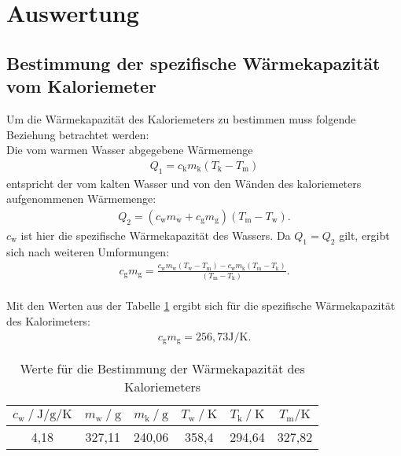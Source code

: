 \section{Auswertung}
\label{sec:Auswertung}
\subsection{Bestimmung der spezifische Wärmekapazität vom Kaloriemeter}
Um die Wärmekapazität des Kaloriemeters zu bestimmen muss folgende Beziehung betrachtet werden:\\
Die vom warmen Wasser abgegebene Wärmemenge
\begin{align}
Q_\mathrm{1}=c_\mathrm{k} m_\mathrm{k}(T_\mathrm{k}-T_\mathrm{m})
\end{align}
entspricht der vom kalten Wasser und von den Wänden des kaloriemeters aufgenommenen Wärmemenge:
\begin{align}
Q_\mathrm{2}=(c_\mathrm{w} m_\mathrm{w} + c_\mathrm{g} m_\mathrm{g}) (T_\mathrm{m}-T_\mathrm{w}).
\end{align}
$c_\mathrm{w}$ ist hier die spezifische Wärmekapazität des Wassers.
Da $Q_\mathrm {1}=Q_\mathrm{2}$ gilt, ergibt sich nach weiteren Umformungen:
\begin{align*}
c_\mathrm{g}m_\mathrm{g}=\frac{c_\mathrm{w} m_\mathrm{w}(T_\mathrm{w}-T_\mathrm{m})-c_\mathrm{w} m_\mathrm{k}(T_\mathrm{m}-T_\mathrm{k})}{(T_\mathrm{m}-T_\mathrm{k})}.
\end{align*}\\
Mit den Werten aus der Tabelle \ref{tab:nullmessung} ergibt sich für die spezifische Wärmekapazität des Kalorimeters:
\begin{align}
  c_\mathrm{g}m_\mathrm{g}=256,73 \si{\joule\per\kelvin}.
\end{align}
\begin{table}
  \centering
  \caption{Werte für die Bestimmung der Wärmekapazität des Kaloriemeters}
  \label{tab:nullmessung}
  \begin{tabular}{c c c c c c}
    \toprule
    $c_\mathrm{w}\:/\ \si{\joule\per\gram\per\kelvin}$ & $m_\mathrm{w}\:/\ \si{\gram}$ & $m_\mathrm{k}\:/\ \si{\gram}$ & $T_\mathrm{w}\:/\ \si{\kelvin}$ &  $T_\mathrm{k}\:/\ \si{\kelvin}$ & $T_\mathrm{m}/\si{\kelvin}$  \\
    \midrule
    4,18 & 327,11 & 240,06 & 358,4 & 294,64 & 327,82 \\
    \bottomrule
   \end{tabular}
\end{table}\\


